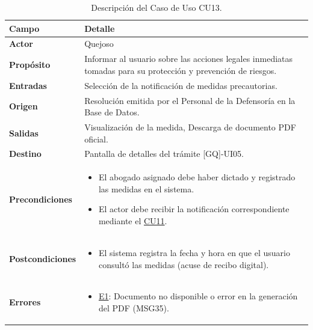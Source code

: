 \begin{appendices}
\begin{table}[htbp]
\centering
\small
\begin{tabular}{|p{3.5cm}|p{10.5cm}|}
\hline
\rowcolor[HTML]{EFEFEF} 
\textbf{Campo} & \textbf{Detalle} \\ \hline
\textbf{Actor} & Quejoso \\ \hline
\textbf{Propósito} & Informar al usuario sobre las acciones legales inmediatas tomadas para su protección y prevención de riesgos. \\ \hline
\textbf{Entradas} & Selección de la notificación de medidas precautorias. \\ \hline
\textbf{Origen} & Resolución emitida por el Personal de la Defensoría en la Base de Datos. \\ \hline
\textbf{Salidas} & Visualización de la medida, Descarga de documento PDF oficial. \\ \hline
\textbf{Destino} & Pantalla de detalles del trámite [GQ]-UI05. \\ \hline
\textbf{Precondiciones} & 
\begin{itemize}[nosep, leftmargin=*]
    \item El abogado asignado debe haber dictado y registrado las medidas en el sistema.
    \item El actor debe recibir la notificación correspondiente mediante el \hyperlink{anexo:casos_uso}{CU11}.
\end{itemize} \\ \hline
\textbf{Postcondiciones} & 
\begin{itemize}[nosep, leftmargin=*]
    \item El sistema registra la fecha y hora en que el usuario consultó las medidas (acuse de recibo digital).
\end{itemize} \\ \hline
\textbf{Errores} & 
\begin{itemize}[nosep, leftmargin=*]
    \item \hyperlink{err:E18}{E1}: Documento no disponible o error en la generación del PDF (MSG35).
\end{itemize} \\ \hline
\end{tabular}
\caption{Descripción del Caso de Uso CU13.}
\label{tab:cu13_especificacion}
\end{table}


\end{appendices}
